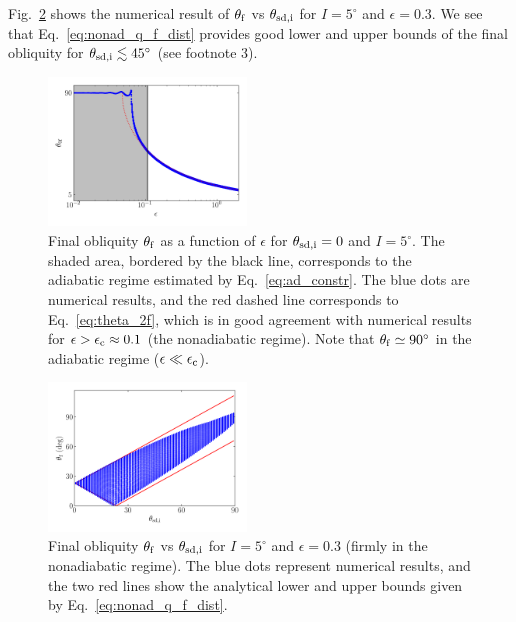 \documentclass[twocolumn,twocolappendix]{aastex63}
\begin{document}
Fig.~\ref{fig:nonad_3_ensemble} shows the numerical result of $\theta_{\rm f}$
vs $\theta_{\rm sd,i}$ for $I =5^\circ$ and $\epsilon = 0.3$. We see that
Eq.~\eqref{eq:nonad_q_f_dist} provides good lower and upper bounds of the final
obliquity for $\theta_{\rm sd,i} \lesssim 45^\circ$ (see footnote 3).

\begin{figure}
    \centering
    \includegraphics[width=0.47\textwidth]{plots_diskdisp/3scan.png}
    \caption{Final obliquity $\theta_{\rm  f}$ as a function of $\epsilon$ for
    $\theta_{\rm sd,i} = 0$ and $I = 5^\circ$. The shaded area, bordered by the
    black line, corresponds to the adiabatic regime estimated by
    Eq.~\eqref{eq:ad_constr}. The blue dots are numerical results, and the red
    dashed line corresponds to Eq.~\eqref{eq:theta_2f}, which is in good
    agreement with numerical results for $\epsilon > \epsilon_{\rm c} \approx
    0.1$ (the nonadiabatic regime). Note that $\theta_{\rm f} \simeq 90^\circ$
    in the adiabatic regime ($\epsilon\ll \epsilon_{\rm
    c}$).}\label{fig:nonad_3_scan}
\end{figure}
\begin{figure}
    \centering
    \includegraphics[width=0.47\textwidth]{plots_diskdisp/3_ensemble_05_05.png}
    \caption{Final obliquity $\theta_{\rm  f}$ vs $\theta_{\rm sd, i}$ for
    $I=5^\circ$ and $\epsilon = 0.3$ (firmly in the nonadiabatic regime). The
    blue dots represent numerical results, and the two red lines show the
    analytical lower and upper bounds given by
    Eq.~\eqref{eq:nonad_q_f_dist}.}\label{fig:nonad_3_ensemble}
\end{figure}
\end{document}
